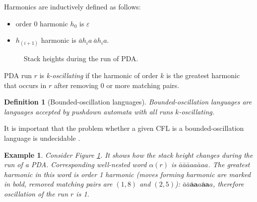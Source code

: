 \documentclass[11pt,a4paper]{article} %
\newtheorem{definition}{Definition}
\newtheorem{example}{Example}
\begin{document}
Harmonics are inductively defined as follows:
\begin{itemize}
\item  order 0 harmonic $h_0$ is $\varepsilon$
\item  $h_{(i+1)}$ harmonic is $\bar{a}h_ia\ \bar{a}h_ia$.
\end{itemize}
\begin{figure}
\centering
{}
\caption{Stack heights during the run of PDA.}
\label{oscb}
\end{figure}


PDA run $r$ is \textit{k-oscillating} if the harmonic of order $k$ is the greatest harmonic that occurs in $r$ after removing $0$ or more matching pairs. 

\begin{definition}[Bounded-oscillation languages]
Bounded-oscillation languages are languages accepted by pushdown automata with all runs $k$-oscillating. 
\end{definition}
It is important that the problem whether a given CFL is a bounded-oscillation language is undecidable \cite{BoundOsc}.

\begin{example}
Consider Figure \ref{oscb}. It shows how the stack height changes during the run of a PDA. Corresponding well-nested word $\alpha(r)$ is $\bar{a}\bar{a}\bar{a}aa\bar{a}aa$. The greatest harmonic in this word is order 1 harmonic (moves forming harmonic are marked in bold, removed matching pairs are $(1, 8)$ and $(2, 5)$): $\bar{a}\bar{a}\mathbf{\bar{a}a}a\mathbf{\bar{a}a}a$, therefore oscillation of the run $r$ is 1.
\end{example}
\end{document}
